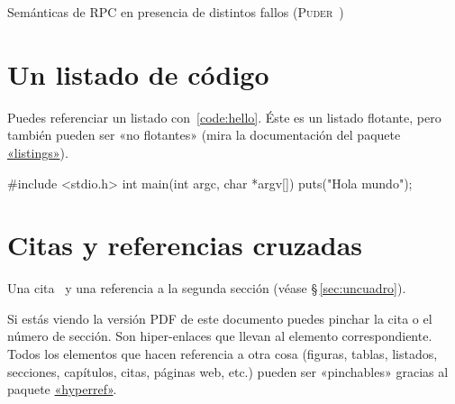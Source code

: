 \begin{table}[htbp]
  \centering
  {\small
  
  }
  \caption[Semánticas de \acs{RPC} en presencia de distintos fallos]
  {Semánticas de \acs{RPC} en presencia de distintos fallos
    (\textsc{Puder}~\cite{puder05:_distr_system_archit})}
  \label{tab:rpc-semantics}
\end{table}


\section{Un listado de código}
\label{sec:listado}

Puedes referenciar un listado con~\ref{code:hello}. Éste es un listado flotante,
pero también pueden ser «no flotantes» (mira la documentación del paquete
\href{http://www.ctan.org/get/macros/latex/contrib/listings/listings.pdf}{«listings»}).

\begin{listing}[
  float,
  language = C,
  caption  = {«Hola mundo» en C},
  label    = code:hello]
#include <stdio.h>
int main(int argc, char *argv[]) {
    puts("Hola mundo\n");
}
\end{listing}




\section{Citas y referencias cruzadas}

Una cita~\cite{design_patterns} y una referencia a la segunda sección (véase
\S\,\ref{sec:uncuadro}).

Si estás viendo la versión PDF de este documento puedes pinchar la cita o el
número de sección. Son hiper-enlaces que llevan al elemento correspondiente. Todos los
elementos que hacen referencia a otra cosa (figuras, tablas, listados,
secciones, capítulos, citas, páginas web, etc.) pueden ser «pinchables» gracias al
paquete \href{http://latex.tugraz.at/_media/docs/hyperref.pdf}{«hyperref»}.


